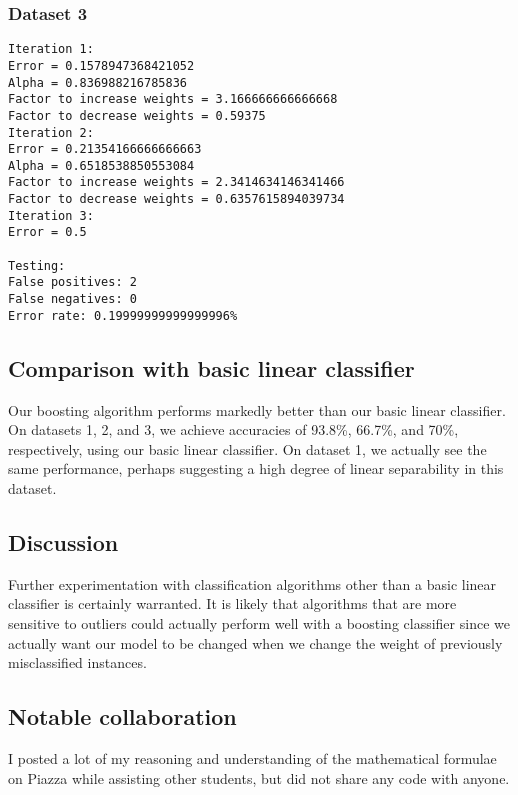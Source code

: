 \documentclass[12pt]{article}
\begin{document}
\subsubsection{Dataset 3}

\begin{verbatim}
Iteration 1:
Error = 0.1578947368421052
Alpha = 0.836988216785836
Factor to increase weights = 3.166666666666668
Factor to decrease weights = 0.59375
Iteration 2:
Error = 0.21354166666666663
Alpha = 0.6518538850553084
Factor to increase weights = 2.3414634146341466
Factor to decrease weights = 0.6357615894039734
Iteration 3:
Error = 0.5

Testing: 
False positives: 2
False negatives: 0
Error rate: 0.19999999999999996%
\end{verbatim}

\subsection{Comparison with basic linear classifier}

Our boosting algorithm performs markedly better than our basic linear classifier. On datasets 1, 2, and 3, we achieve accuracies of 93.8\%, 66.7\%, and 70\%, respectively, using our basic linear classifier. On dataset 1, we actually see the same performance, perhaps suggesting a high degree of linear separability in this dataset. 

\subsection{Discussion}

Further experimentation with classification algorithms other than a basic linear classifier is certainly warranted. It is likely that algorithms that are more sensitive to outliers could actually perform well with a boosting classifier since we actually want our model to be changed when we change the weight of previously misclassified instances.

\subsection{Notable collaboration}

I posted a lot of my reasoning and understanding of the mathematical formulae on Piazza while assisting other students, but did not share any code with anyone. 
\end{document}
